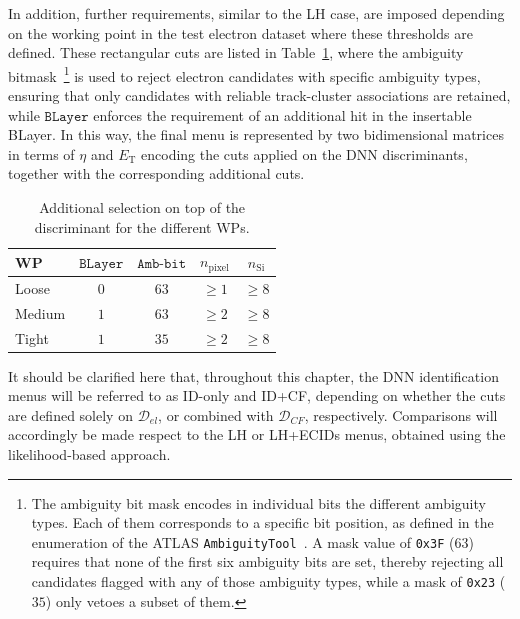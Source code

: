 In addition, further requirements, similar to the LH case, are imposed depending on the working point in the test electron dataset where these thresholds are defined. These rectangular cuts are listed in Table~\ref{tab:wp_rectangular_cuts},
where the ambiguity bitmask~\footnote{The ambiguity bit mask encodes in individual bits the different ambiguity types. Each of them corresponds to a specific bit position, as defined in the enumeration of the ATLAS \texttt{AmbiguityTool}~\cite{atlas:AmbiguityTool}. A mask value of \texttt{0x3F} (\(63\)) requires that none of the first six ambiguity bits are set, thereby rejecting all candidates flagged with any of those ambiguity types, while a mask of \texttt{0x23} (\(35\)) only vetoes a subset of them.} is used to reject electron candidates with specific ambiguity types, ensuring that only candidates with reliable track-cluster associations are retained, while $\texttt{BLayer}$ enforces the requirement of an additional hit in the insertable BLayer. In this way, the final menu is represented by two bidimensional matrices in terms of $\eta$ and $E_{\text{T}}$ encoding the cuts applied on the DNN discriminants, together with the corresponding additional cuts.
\begin{table}[h]
  \centering
  \footnotesize
  \caption{Additional selection on top of the discriminant for the different WPs.}
  \label{tab:wp_rectangular_cuts}
  \begin{tabular}{lcccc}
  \hline
  WP & $\texttt{BLayer}$ & $\texttt{Amb-bit}$ & $n_{\mathrm{pixel}}$ & $n_{\mathrm{Si}}$ \\
  \hline
  Loose  & 0 & $63$ & $\geq 1$ & $\geq 8$ \\
  Medium & $1$ & $63$ & $\geq 2$ & $\geq 8$ \\
  Tight  & $1$ & $35$ & $\geq 2$ & $\geq 8$ \\
  \hline
  \end{tabular}
\end{table}

It should be clarified here that, throughout this chapter, the DNN identification menus will be referred to as ID-only and ID+CF, depending on whether the cuts are defined solely on $\mathcal{D}_{el}$, or combined with $\mathcal{D}_{CF}$, respectively. Comparisons will accordingly be made respect to the LH or LH+ECIDs menus, obtained using the likelihood-based approach.

